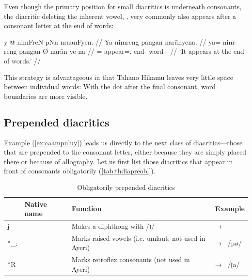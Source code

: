 Even though the primary position for small diacritics is underneath consonants,
the diacritic deleting the inherent vowel, , very commonly also appears
after a consonant letter at the end of words:

\ex[everygla=\Tagati\Large,everyglb=\itshape]\begingl
	\gla y @ nimFreN\thafterdot{} pNn\thafterdot{} 
		nraanFyen. //
	\glb Ya nimreng pangan narānyena. //
	\glc ya= nim-reng pangan-Ø narān-ye-na //
	\glc \LocT{}= appear=\TsgI{}.\Aarg{} end-\Top{} word-\Pl{}-\Gen{} //
	\glft `It appears at the end of words.' //
\endgl\xe

This strategy is advantageous in that Tahano Hikamu leaves very little space
between individual words:  With the dot after the final consonant, word boundaries are more
visible.

\subsection{Prepended diacritics}

Example (\ref{ex:caampuluy}) leads us directly to the next class of 
diacritics---those that are prepended to the consonant letter, either because 
they are simply placed there or because of allography. Let us first list those 
diacritics that appear in front of consonants obligatorily 
(\autoref{tab:thdiapreobl}).

\begin{table}[tp]
\caption{Obligatorily prepended diacritics}
\begin{tabu} to 
\toprule
\tableheaderfont

	& Native name
	& Function
	& Example
	\\
	
\toprule

*j
	& 
	& Makes a diphthong with /ɪ/
	&  → 
	\\
	
\midrule

*\_:
	& 
	& Marks raised vowels (i.e. umlaut; not used in Ayeri)
	&  → ~/pø/
	\\
	
\midrule

*R
	& 
	& Marks retroflex consonants (not used in Ayeri)%
	&  → ~/ʈa/
	\\

\bottomrule
\end{tabu}
\label{tab:thdiapreobl}
\end{table}


